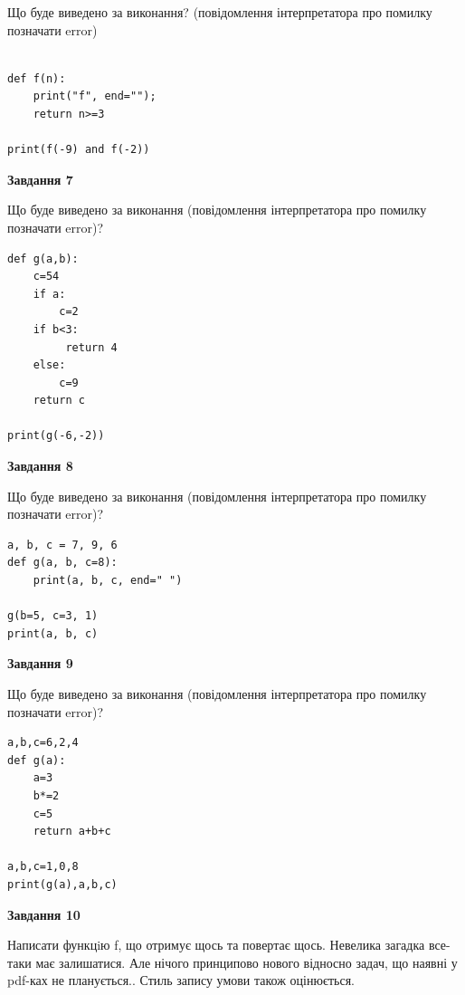 \documentclass[12pt, ukrainian]{article}
\begin{document}
{\begin {large}
Що буде виведено за виконання? (повідомлення інтерпретатора про помилку позначати error)\par
\begin{verbatim}

def f(n):
    print("f", end="");
    return n>=3

print(f(-9) and f(-2))
\end{verbatim}

{\begin {center}\textbf{Завдання 7}\end {center}}

Що буде виведено за виконання (повідомлення інтерпретатора про помилку позначати error)?\par
\begin{verbatim}
def g(a,b):
    c=54
    if a:
        c=2
    if b<3:
         return 4
    else: 
        c=9
    return c

print(g(-6,-2))
\end{verbatim}

{\begin {center}\textbf{Завдання 8}\end {center}}

Що буде виведено за виконання (повідомлення інтерпретатора про помилку позначати error)?\par
\begin{verbatim}
a, b, c = 7, 9, 6
def g(a, b, c=8):
    print(a, b, c, end=" ")

g(b=5, c=3, 1)
print(a, b, c)
\end{verbatim}

{\begin {center}\textbf{Завдання 9}\end {center}}

Що буде виведено за виконання (повідомлення інтерпретатора про помилку позначати error)?\par
\begin{verbatim}
a,b,c=6,2,4
def g(a):
    a=3
    b*=2
    c=5
    return a+b+c

a,b,c=1,0,8
print(g(a),a,b,c)
\end{verbatim}

{\begin {center}\textbf{Завдання 10}\end {center}}


Написати функцiю f, що отримує щось та повертає щось. Невелика загадка все-таки має залишатися. Але нічого принципово нового відносно задач, що наявні у pdf-ках не планується.. Стиль запису умови також оцінюється.\par
\end {large}}
\newpage
\end{document}
